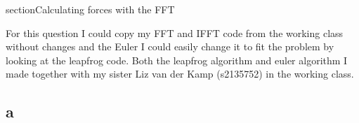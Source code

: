 section{Calculating forces with the FFT}

For this question I could copy my FFT and IFFT code from the working class without changes and the Euler I could easily change it to fit the problem by looking at the leapfrog code. 
Both the leapfrog algorithm and euler algorithm I made together with my sister Liz van der Kamp (s2135752) in the working class. 

\subsection*{a}
